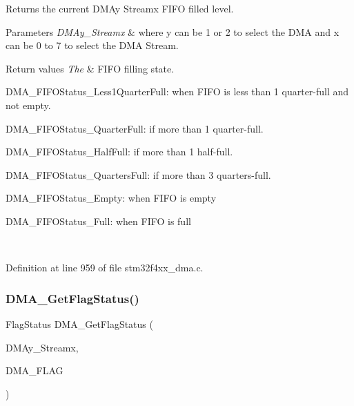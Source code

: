 Returns the current D\+M\+Ay Streamx F\+I\+FO filled level. 


\begin{DoxyParams}{Parameters}
{\em D\+M\+Ay\+\_\+\+Streamx} & where y can be 1 or 2 to select the D\+MA and x can be 0 to 7 to select the D\+MA Stream. \\
\hline
\end{DoxyParams}

\begin{DoxyRetVals}{Return values}
{\em The} & F\+I\+FO filling state.
\begin{DoxyItemize}
\item D\+M\+A\+\_\+\+F\+I\+F\+O\+Status\+\_\+\+Less1\+Quarter\+Full\+: when F\+I\+FO is less than 1 quarter-\/full and not empty.
\item D\+M\+A\+\_\+\+F\+I\+F\+O\+Status\+\_\+Quarter\+Full\+: if more than 1 quarter-\/full.
\item D\+M\+A\+\_\+\+F\+I\+F\+O\+Status\+\_\+\+Half\+Full\+: if more than 1 half-\/full.
\item D\+M\+A\+\_\+\+F\+I\+F\+O\+Status\+\_\+Quarters\+Full\+: if more than 3 quarters-\/full.
\item D\+M\+A\+\_\+\+F\+I\+F\+O\+Status\+\_\+\+Empty\+: when F\+I\+FO is empty
\item D\+M\+A\+\_\+\+F\+I\+F\+O\+Status\+\_\+\+Full\+: when F\+I\+FO is full 
\end{DoxyItemize}\\
\hline
\end{DoxyRetVals}


Definition at line 959 of file stm32f4xx\+\_\+dma.\+c.

\mbox{\label{group___d_m_a___group4_ga10cfc0fe31d64a1fd8fb3efb4ae2a411}} 
\subsubsection{\texorpdfstring{D\+M\+A\+\_\+\+Get\+Flag\+Status()}{DMA\_GetFlagStatus()}}
{\footnotesize\ttfamily Flag\+Status D\+M\+A\+\_\+\+Get\+Flag\+Status (\begin{DoxyParamCaption}\item[{\hyperlink{struct_d_m_a___stream___type_def}{D\+M\+A\+\_\+\+Stream\+\_\+\+Type\+Def} $\ast$}]{D\+M\+Ay\+\_\+\+Streamx,  }\item[{uint32\+\_\+t}]{D\+M\+A\+\_\+\+F\+L\+AG }\end{DoxyParamCaption})}



